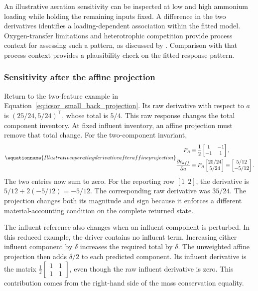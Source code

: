 An illustrative aeration sensitivity can be inspected at low and high ammonium loading while holding the remaining inputs fixed. A difference in the two derivatives identifies a loading-dependent association within the fitted model. Oxygen-transfer limitations and heterotrophic competition provide process context for assessing such a pattern, as discussed by \citet{StenstromSong1991}. Comparison with that process context provides a plausibility check on the fitted response pattern.

\subsubsection{Sensitivity after the affine projection}

Return to the two-feature example in Equation~\eqref{eq:icsor_small_back_projection}. Its raw derivative with respect to \(a\) is \((25/24,5/24)^\top\), whose total is \(5/4\). This raw response changes the total component inventory. At fixed influent inventory, an affine projection must remove that total change. For the two-component invariant,
\begin{equation}
\equationname{Illustrative operating derivative after affine projection}
\label{eq:icsor_small_projection_derivative}
\begin{aligned}
P_A&=\frac{1}{2}\begin{bmatrix}1&-1\\-1&1\end{bmatrix},\\
\frac{\partial c_{aff}}{\partial a}
&=P_A\begin{bmatrix}25/24\\5/24\end{bmatrix}
=\begin{bmatrix}5/12\\-5/12\end{bmatrix}.
\end{aligned}
\end{equation}
The two entries now sum to zero. For the reporting row \([1\ \ 2]\), the derivative is \(5/12+2(-5/12)=-5/12\). The corresponding raw derivative was \(35/24\). The projection changes both its magnitude and sign because it enforces a different material-accounting condition on the complete returned state.

The influent reference also changes when an influent component is perturbed. In this reduced example, the driver contains no influent term. Increasing either influent component by \(\delta\) increases the required total by \(\delta\). The unweighted affine projection then adds \(\delta/2\) to each predicted component. Its influent derivative is the matrix \(\frac12\begin{bmatrix}1&1\\1&1\end{bmatrix}\), even though the raw influent derivative is zero. This contribution comes from the right-hand side of the mass conservation equality.

